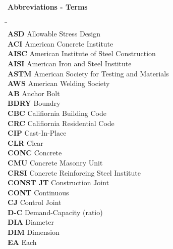 \documentclass[12pt,notitle,letterpaper]{report}
\begin{document}
\begin{center} \textbf{Abbreviations - Terms } \end{center}

\setlength{\parindent}{0.2in}
\vspace{-0.3in}
\begin{tabbing}
\hspace*{4cm} \= \kill
    \indent\textbf{}         \>  {}\\
    \indent\textbf{ASD}      \>  {Allowable Stress Design}\\
    \indent\textbf{ACI}      \>  {American Concrete Institute}\\
    \indent\textbf{AISC}     \>  {American Institute of Steel Construction}\\
    \indent\textbf{AISI}     \>  {American Iron and Steel Institute}\\
    \indent\textbf{ASTM}     \>  {American Society for Testing and Materials}\\
    \indent\textbf{AWS}      \>  {American Welding Society}\\
    \indent\textbf{AB}       \>  {Anchor Bolt}\\
    \indent\textbf{BDRY}     \>  {Boundry}\\
    \indent\textbf{CBC}      \>  {Califiornia Building Code}\\
    \indent\textbf{CRC}      \>  {Califiornia Residential Code}\\
    \indent\textbf{CIP}      \>  {Cast-In-Place}\\
    \indent\textbf{CLR}      \>  {Clear}\\
    \indent\textbf{CONC}     \>  {Concrete}\\
    \indent\textbf{CMU}      \>  {Concrete Masonry Unit}\\
    \indent\textbf{CRSI}     \>  {Concrete Reinforcing Steel Institute}\\
    \indent\textbf{CONST JT} \>  {Construction Joint}\\
    \indent\textbf{CONT}     \>  {Continuous}\\
    \indent\textbf{CJ}       \>  {Control Joint}\\
    \indent\textbf{D-C}      \>  {Demand-Capacity (ratio)}\\
    \indent\textbf{DIA}      \>  {Diameter}\\
    \indent\textbf{DIM}      \>  {Dimension}\\
    \indent\textbf{EA}       \>  {Each}\\

\end{tabbing}
\end{document}
